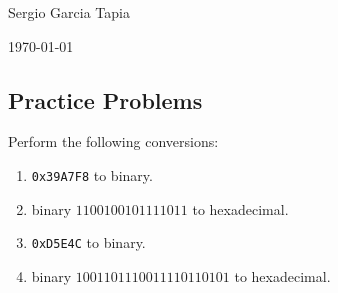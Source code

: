 \documentclass[12pt]{article}
\newenvironment{ex}[2][Exercise]{\begin{trivlist}
		\item[\hskip \labelsep {\bfseries #1}\hskip \labelsep {\bfseries #2.}]}{\end{trivlist}}
\begin{document}

\noindent Sergio Garcia Tapia \hfill

 \hfill

 \hfill 

\noindent\today

\subsection*{Practice Problems}
\begin{ex}{2.1}
	Perform the following conversions:
	\begin{enumerate}[label=(\alph*)]
		\item \texttt{0x39A7F8} to binary.
		\item binary $1100100101111011$ to hexadecimal.
		\item \texttt{0xD5E4C} to binary.
		\item binary $1001101110011110110101$ to hexadecimal.
	\end{enumerate}
\end{ex}
\end{document}
